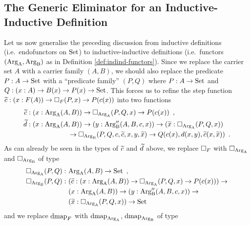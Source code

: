 \documentclass[orivec,envcountsame, ,envcountsect]{llncs}
\begin{document}
\subsection{The Generic Eliminator for an Inductive-Inductive Definition}
\label{sec:elim-indind}

Let us now generalise the preceding discussion from inductive
definitions (i.e.\ endo\-functors on $\text{Set}$) to inductive-inductive
definitions (i.e.\ functors $(\text{Arg}_{\text{A}}, \text{Arg}_{\text{B}})$ as in Definition
\ref{def:indind-functors}). Since we replace the carrier set $A$ with
a carrier family $(A, B)$, we should also replace the predicate $P : A
\to \text{Set}$ with a ``predicate family'' $(P, Q)$ where $P : A \to \text{Set}$
and $Q : (x : A) \to B(x) \to P(x) \to \text{Set}$. This forces us to refine
the step function $\widetilde{c} : (x : F(A)) \to \Box_F(P, x) \to P(c(x))$
into two functions
\begin{align*}
  \widetilde{c} &: (x : \text{Arg}_{\text{A}}(A, B)) \to \Box_{\text{Arg}_{\text{A}}}(P, Q, x) \to P(c(x)) \enspace ,\\
  \widetilde{d} &: (x : \text{Arg}_{\text{A}}(A, B)) \to (y : \text{Arg}_{\text{B}}''(A, B, c, x)) \to
                   (\widetilde{x} : \Box_{\text{Arg}_{\text{A}}}(P, Q, x)) \\
              & \qquad\qquad\qquad \to \Box_{\text{Arg}_{\text{B}}}(P, Q, c, \widetilde{c}, x, y, \widetilde{x}) \to Q(c(x), d(x, y), \widetilde{c}(x, \widetilde{x})) \enspace .
\end{align*}
%
%
As can already be seen in the types of $\widetilde{c}$ and $\widetilde{d}$ above, we replace
$\Box_F$ with $\Box_{\text{Arg}_{\text{A}}}$ and $\Box_{\text{Arg}_{\text{B}}}$ of type
\begin{align*}
  \BOX_{\ArgA}(P, Q) :\ &\ArgA(A, B) \to \Set \enspace ,\\
%
  \BOX_{\ArgB}(P, Q) :\ %
                     &(\stepind{c} : (x : \ArgA(A, B)) \to \BOX_{\ArgA}(P, Q, x) \to P(c(x))) \to \\
                     &(x : \ArgA(A, B)) \to (y : \ArgB''(A, B, c, x)) \to \\
                     & (\stepind{x} : \BOX_{\ArgA}(P, Q, x)) \to \Set
\end{align*} %
%
and we replace $\text{dmap}_F$ with $\text{dmap}_{\text{Arg}_{\text{A}}}$, $\text{dmap}_{\text{Arg}_{\text{B}}}$ of type
\end{document}
